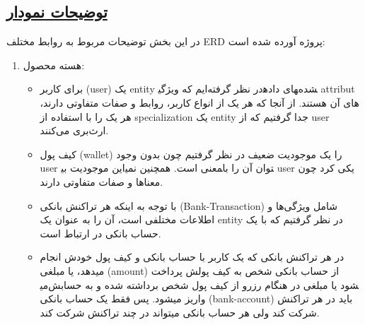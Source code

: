 \subsection*{\underline{توضیحات نمودار}}

در این بخش توضیحات مربوط به روابط مختلف ERD پروژه آورده شده است:

\begin{enumerate}
	\item هسته محصول:
	\begin{itemize}
		\item 
		برای کاربر (user) یک entity در نظر گرفته‌ایم که ویژگی‎های داده‎شده attribut های آن هستند. از آنجا که هر یک از انواع کاربر، روابط و صفات متفاوتی دارند، هر یک را با استفاده از specialization یک entity جدا گرفتیم که از user ارث‌بری می‌کنند.
		\item 
		کیف پول (wallet) را یک موجودیت ضعیف در نظر گرفتیم چون بدون وجود user این موجودیت بی‎معنی است. همچنین نمی‎توان آن را با user یکی کرد چون معناها و صفات متفاوتی دارند.
		\item 
		با توجه به اینکه هر تراکنش بانکی (Bank-Transaction) شامل ویژگی‌ها و اطلاعات مختلفی است، آن را به عنوان یک entity در نظر گرفتیم که با یک حساب بانکی در ارتباط است.
		
		\item 
		در هر تراکنش بانکی که یک کاربر با حساب بانکی و کیف پول خودش انجام میدهد، یا مبلغی (amount) از حساب بانکی شخص به کیف پولش پرداخت می‎شود یا مبلغی در هنگام رزرو از کیف پول شخص برداشته شده و به حسابش واریز میشود.
		پس فقط یک حساب بانکی (bank-account) باید در هر تراکنش شرکت کند ولی هر حساب بانکی میتواند در چند تراکنش شرکت کند.
		

\end{itemize}
\end{enumerate}
